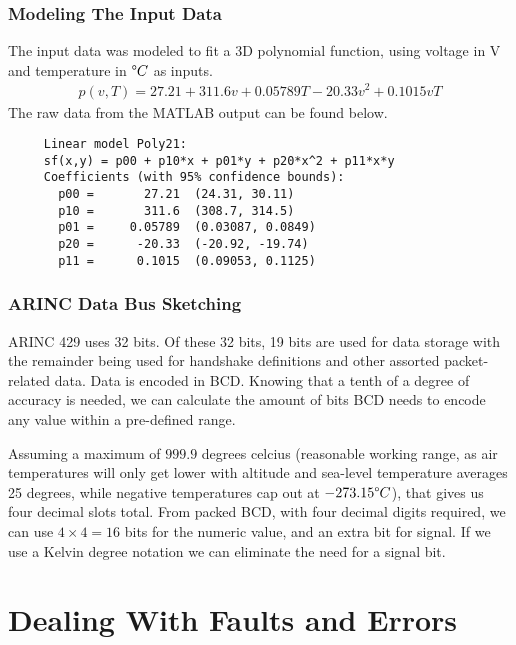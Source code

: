 \documentclass[english,palatino]{ist-report}
\begin{document}
\section{Modeling The Input Data}

The input data was modeled to fit a 3D polynomial function, using voltage in \si{\volt} and temperature in $\degree C$ as inputs.
\begin{gather*}
	p(v,T) = 27.21 + 311.6v + 0.05789T - 20.33v^2 + 0.1015vT
\end{gather*}
The raw data from the MATLAB output can be found below.  
\begin{verbatim}
     Linear model Poly21:
     sf(x,y) = p00 + p10*x + p01*y + p20*x^2 + p11*x*y
     Coefficients (with 95% confidence bounds):
       p00 =       27.21  (24.31, 30.11)
       p10 =       311.6  (308.7, 314.5)
       p01 =     0.05789  (0.03087, 0.0849)
       p20 =      -20.33  (-20.92, -19.74)
       p11 =      0.1015  (0.09053, 0.1125)
\end{verbatim}

\section{ARINC Data Bus Sketching}

ARINC 429 uses 32 bits. Of these 32 bits, 19 bits are used for data storage with the remainder being used for handshake definitions and other assorted packet-related data. Data is encoded in BCD. Knowing that a tenth of a degree of accuracy is needed, we can calculate the amount of bits BCD needs to encode any value within a pre-defined range.

Assuming a maximum of $999.9$ degrees celcius (reasonable working range, as air temperatures will only get lower with altitude and sea-level temperature averages 25 degrees, while negative temperatures cap out at $\num{-273.15}\degree C$), that gives us four decimal slots total. From packed BCD, with four decimal digits required, we can use $4 \times 4 = 16$ bits for the numeric value, and an extra bit for signal. If we use a Kelvin degree notation we can eliminate the need for a signal bit.

\part{Dealing With Faults and Errors}
\end{document}
